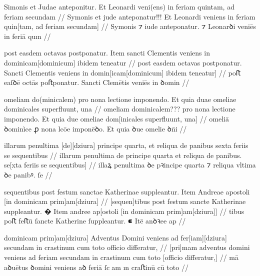 \ex \bg
\gla
{}
Simonis et Judae anteponitur.
Et Leonardi veni(ens) in feriam quintam, ad feriam secundam
//
\glRekonstrukcja
{}
Symonis et jude anteponatur!!!
Et Leonardi veniens in feriam quin[tam, ad feriam secundam]
//
\glU
{}
Symonis ⁊ iude anteponatur. ⁊ Leonarꝺi veniēs in feriā quın   
//
\endgl
\xe


\ex \bg
\gla
{}
post easdem octavas postponatur.
Item sancti Clementis veniens in dominicam[dominicum] ibidem teneatur
//
\glRekonstrukcja
{}
post easdem octavas postponatur.
{} Sancti Clementis veniens in domin[icam[dominicum] ibidem teneatur]
//
\glU
{}
poﬅ eaſꝺē octās poﬅponatur. {} Sancti Clemētis veniēs in ꝺomin  
//
\endgl
\xe


\ex \bg
\gla
{}
omeliam do(minicalem) pro nona lectione imponendo. Et quia duae
omeliae dominicales superfluunt, una 
//
\glRekonstrukcja
{}
omeliam dominicalem??? pro nona lectione imponendo. Et quia due
omeliae dom[inicales superfluunt, una]
//
\glU
{}
omeliā ꝺominìce ꝓ nona lcōe imponēꝺo. Et quia ꝺue omelie ꝺn̄i  
//
\endgl
\xe




\ex \bg
\gla
{}
illarum penultima [de][dziura] principe
quarta, et reliqua de panibus sexta feriis se sequentibus
//
\glRekonstrukcja
{}
illarum penultima de principe
quarta et reliqua de panibus. se[xta feriis se sequentibus]
//
\glU
{}
illaꝝ penultima ꝺe pꝛincipe quarta ⁊ reliqua vltima ꝺe panibꝰ. ſe   
//
\endgl
\xe



\ex \bg
\gla
{}
sequentibus post festum
sanctae Katherinae suppleantur.
{} Item Andreae apostoli [in dominicam prim]am[dziura]
//
\glRekonstrukcja
{}
[sequen]tibus post festum
sancte Katherinae suppleantur.
� Item andree ap[ostoli [in dominicam prim]am[dziura]]
//
\glU
{}
tibus poﬅ feﬅū ſancte Katherine ſuppleantur. ⁌ Itē anꝺꝛee ap   
//
\endgl
\xe


\ex \bg
\gla
{}
dominicam prim]am[dziura] Adventus Domini
veniens ad fer[iam][dziura] secundam in crastinum cum toto officio differatur,
//
\glRekonstrukcja
{}
[pri]mam adventus domini
veniens ad feriam secundam in crastinum cum toto [officio differatur,]
//
\glU
{}
mā aꝺuētus ꝺomini veniens aꝺ feriā ſcam ın craﬅinū cū toto  
//
\endgl
\xe



